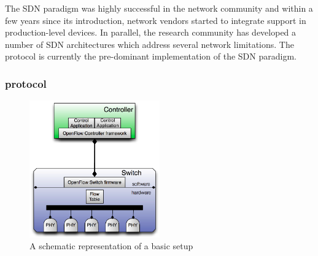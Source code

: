 The SDN paradigm was highly successful in the network community and within a few
years since its introduction, network vendors started to integrate support in
production-level devices. In parallel, the research community has developed a
number of SDN architectures which address several network limitations. The \of
protocol is currently the pre-dominant implementation of the SDN paradigm.

\subsubsection*{\of protocol} 

\begin{figure}
  \begin{center}
\includegraphics[width=0.5\textwidth]{Background/BackgroundFigs/openflow-schema}
\caption{A schematic representation of a basic \of setup}
\label{fig:background:openflow-schema}
\end{center}
\end{figure}

